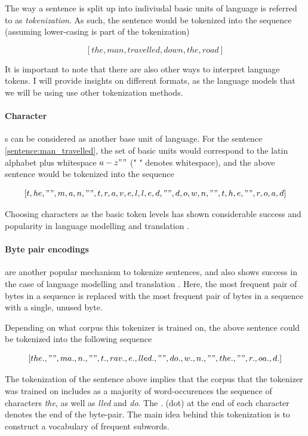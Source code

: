 \documentclass[a4paper,12pt,twoside,openright]{report}
\begin{document}
The way a sentence is split up into indiviudal basic units of language is referred to as \textit{tokenization}.
As such, the sentence would be tokenized into the sequence (assuming lower-casing is part of the tokenization)

$$
[the, man, travelled, down, the, road]
$$

It is important to note that there are also other ways to interpret language tokens. 
I will provide insights on different formats, as the language models that we will be using use other tokenization methods.

\paragraph{Character}s can be considered as another base unit of language.
For the sentence \eqref{sentence:man_travelled}, the set of basic units would correspond to the latin alphabet plus whitespace $a - z" "$ (" " denotes whitespace), and the above sentence would be tokenized into the sequence 

$$
[t, h e, " ", m, a, n, " ", t, r, a, v, e, l, l, e, d, " ", d, o, w, n, " ", t, h, e, " ", r, o, a, d]
$$

Choosing characters as the basic token levels has shown considerable success and popularity in language modelling \cite{sutskever11} and translation \cite{lee17}.

\paragraph{Byte pair encodings} \cite{gage94} are another popular mechanism to tokenize sentences, and also shows success in the case of language modelling and translation \cite{sennrich16}. 
Here, the most frequent pair of bytes in a sequence is replaced with the most frequent pair of bytes in a sequence with a single, unused byte.

Depending on what corpus this tokenizer is trained on, the above sentence could be tokenized into the following sequence

$$
[the., " ", ma., n., " ", t., rav., e., lled., " ", do., w., n., " ", the., " ", r., oa., d.]
$$

The tokenization of the sentence above implies that the corpus that the tokenizer was trained on includes as a majority of word-occurences the sequence of characters \textit{the}, as well as \textit{lled} and \textit{do}. 
The $.$ (dot) at the end of each character denotes the end of the byte-pair.
The main idea behind this tokenization is to construct a vocabulary of frequent subwords.
\end{document}
